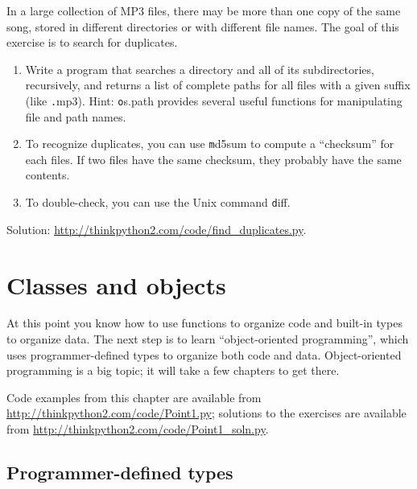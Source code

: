 \documentclass[
DIV=11,
fontsize=13,
twoside,
headinclude=false,
titlepage=firstiscover,
abstract=true,
headsepline=true,
footsepline=true,
chapterprefix=true, %
headings=big,
bibliography=totoc,%
captions=tableheading
]{scrbook}
\theoremstyle{definition}
\begin{document}
\begin{exercise}
\normalfont
\label{checksum}

In a large collection of MP3 files, there may be more than one
copy of the same song, stored in different directories or with
different file names.  The goal of this exercise is to search for
duplicates.

\begin{enumerate}

\item Write a program that searches a directory and all of its
subdirectories, recursively, and returns a list of complete paths
for all files with a given suffix (like {\texttt .mp3}).
Hint: {\texttt os.path} provides several useful functions for
manipulating file and path names.

\item To recognize duplicates, you can use {\texttt md5sum}
to compute a ``checksum'' for each files.  If two files have
the same checksum, they probably have the same contents.

\item To double-check, you can use the Unix command {\texttt diff}.

\end{enumerate}

Solution: \url{http://thinkpython2.com/code/find_duplicates.py}.

\end{exercise}



\chapter{Classes and objects}
\label{clobjects}

At this point you know how to use
functions to organize code and 
built-in types to organize data.  The next step is to learn
``object-oriented programming'', which uses programmer-defined types
to organize both code and data.  Object-oriented programming is
a big topic; it will take a few chapters to get there.

Code examples from this chapter are available from
\url{http://thinkpython2.com/code/Point1.py}; solutions
to the exercises are available from
\url{http://thinkpython2.com/code/Point1_soln.py}.


\section{Programmer-defined types}
\label{point}
\end{document}

